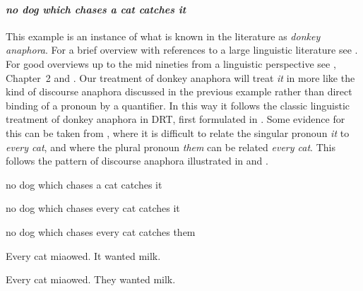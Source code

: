   

\paragraph{\textit{no dog which chases a cat catches it}}
\label{sec:donkey-anaph}
This example is an instance of what is known in the literature as
\textit{donkey anaphora}.  For a brief overview with references to a
large linguistic literature see \cite{KingLewis2018}.  For good
overviews up to the mid nineties from a linguistic perspective see
\cite{Chierchia1995}, Chapter~2 and \cite{Kanazawa1994}.
Our treatment of donkey anaphora will treat 
\textit{it} in   more like the kind of discourse
anaphora discussed in the previous example rather than
direct binding of a pronoun by a quantifier.  In this way it follows
the classic linguistic treatment of donkey anaphora in DRT, first
formulated in \cite{Kamp1981}.  Some evidence for this can be taken
from , where it is difficult to relate the singular pronoun
\textit{it} to \textit{every cat}, and  where the plural
pronoun \textit{them} can be related \textit{every cat}.  This follows
the pattern of discourse anaphora illustrated in  and
.
\begin{ex} 
\begin{subex} 
 
\item no dog which chases a cat catches it 
 
\item no dog which chases every cat catches it

\item no dog which chases every cat catches them

\item Every cat miaowed.  It wanted milk.

\item Every cat miaowed.  They wanted milk. 
 
\end{subex} 
   
\end{ex}

